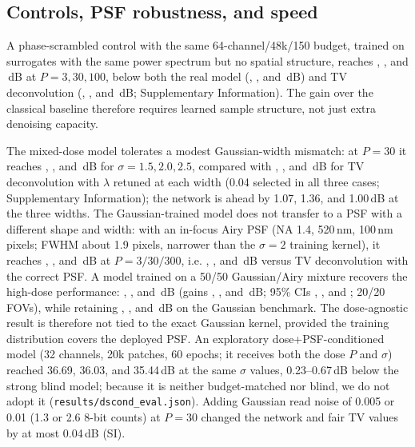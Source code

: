 \documentclass[10pt]{article}
\begin{document}
\subsection{Controls, PSF robustness, and speed}
A phase-scrambled control with the same 64-channel/48k/150 budget, trained on
surrogates with the same power spectrum but no spatial structure, reaches
\ScrPthree, \ScrPthirty, and \ScrPonehundred\,dB at $P=3,30,100$,
below both the real model (\UNetPthree, \UNetPthirty, and \UNetPonehundred\,dB)
and TV deconvolution (\DecPthree, \DecPthirty, and \DecPonehundred\,dB;
Supplementary Information). The gain over the classical
baseline therefore requires learned sample structure, not just extra denoising
capacity.

The mixed-dose model tolerates a modest Gaussian-width mismatch: at $P=30$ it reaches
\SigmaUPfifteen, \SigmaUPtwo, and \SigmaUPtwopfive\,dB for $\sigma=1.5,2.0,2.5$,
compared with \SigmaDecfifteen, \SigmaDectwo, and \SigmaDectwopfive\,dB for
TV deconvolution with $\lambda$ retuned at each width (0.04 selected in all
three cases; Supplementary Information); the network is ahead by 1.07, 1.36,
and 1.00\,dB at the three widths. The
Gaussian-trained model does not transfer to a PSF with a different shape and
width: with an in-focus Airy PSF (NA 1.4, 520\,nm, 100\,nm pixels; FWHM about
1.9 pixels, narrower than the $\sigma=2$ training kernel), it reaches
\AiryStrongUThree,
\AiryStrongUThirty, and \AiryStrongUThreeHundred\,dB at $P=3/30/300$, i.e.
\AiryStrongGainThree, \AiryStrongGainThirty, and
\AiryStrongGainThreeHundred\,dB versus TV deconvolution with the correct PSF. A
model trained on a 50/50 Gaussian/Airy mixture recovers the high-dose
performance: \AiryUThree, \AiryUThirty, and \AiryUThreeHundred\,dB (gains
\AiryGainThree, \AiryGainThirty, and \AiryGainThreeHundred\,dB; 95\% CIs
\AiryCIThree, \AiryCIThirty, and \AiryCIThreeHundred; 20/20 FOVs), while
retaining \PsfMixGaussPThree, \PsfMixGaussPThirty, and
\PsfMixGaussPThreeHundred\,dB on the Gaussian benchmark. The dose-agnostic
result is therefore not tied to the exact Gaussian kernel, provided the
training distribution covers the deployed PSF. An
exploratory dose+PSF-conditioned model (32 channels, 20k patches, 60 epochs;
it receives both the dose $P$ and $\sigma$) reached 36.69, 36.03, and
35.44\,dB at the same $\sigma$ values, 0.23--0.67\,dB below the strong blind
model; because it is neither budget-matched nor blind, we do not adopt it
(\texttt{results/dscond\_eval.json}). Adding Gaussian read
noise of 0.005 or 0.01 (1.3 or 2.6 8-bit counts) at $P=30$ changed the
network and fair TV values by at most 0.04\,dB (SI).
\end{document}
